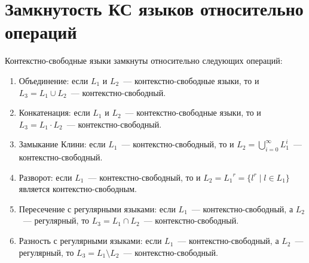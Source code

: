 \section{Замкнутость КС языков относительно операций}
\label{sec:CFLClosureProperties}

\begin{theorem}
    Контекстно-свободные языки замкнуты относительно следующих операций:
    \begin{enumerate}
        \item Объединение: если $L_1$ и $L_2$~--- контекстно-свободные языки, то и $L_3 = L_1 \cup L_2$~--- контекстно-свободный.
        \item Конкатенация: если $L_1$ и $L_2$~--- контекстно-свободные языки, то и $L_3 = L_1 \cdot L_2$~--- контекстно-свободный.
        \item Замыкание Клини: если $L_1$~--- контекстно-свободный, то и $L_2 = \bigcup\limits_{i=0}^{\infty} L_1^i $~--- контекстно-свободный.
        \item Разворот: если $L_1$~--- контекстно-свободный, то и $L_2 = {L_1}^r = \{ l^r \mid l \in L_1\}$ является контекстно-свободным.
        \item Пересечение с регулярными языками: если $L_1$~--- контекстно-свободный, а $L_2$~--- регулярный, то  $L_3 = L_1 \cap L_2$~--- контекстно-свободный.
        \item Разность с регулярными языками: если $L_1$~--- контекстно-свободный, а $L_2$~--- регулярный, то  $L_3 = L_1 \setminus L_2$~--- контекстно-свободный.
    \end{enumerate}
\end{theorem}

